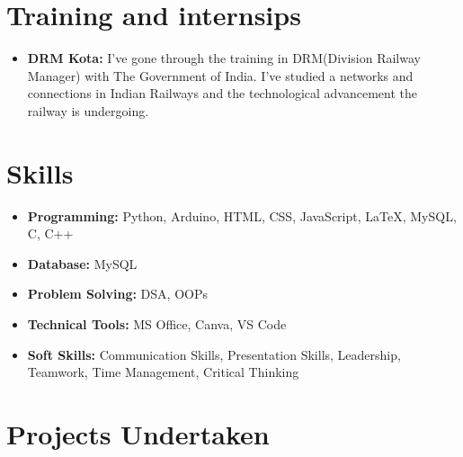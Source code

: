 \documentclass[10pt]{article}
\begin{document}
\section*{{\LARGE \color{myblue}Training and internsips}\xfilll[0pt]{0.5pt}}

\vspace{-15pt}
\vspace{1.5mm}

\begin{itemize}[itemsep = -0.70 mm, leftmargin=*]

\item \noindent \textbf{DRM Kota:} I've gone through the training in DRM(Division Railway Manager) with The Government of India. I've studied a networks and connections in Indian Railways and the technological advancement the railway is undergoing.
\end{itemize}

\vspace{-15pt}
\vspace{-5 pt}
\section*{{\LARGE \color{myblue}Skills}\xfilll[0pt]{0.5pt}}

\vspace{-15pt}
\vspace{1.5mm}

\begin{itemize}[itemsep = -0.70 mm, leftmargin=*]

\item \noindent \textbf{Programming:}  Python, Arduino, HTML, CSS, JavaScript, LaTeX, MySQL, C, C++
\item \noindent \textbf{Database:}  MySQL
\item \noindent \textbf{Problem Solving:}  DSA, OOPs
\item \noindent \textbf{Technical Tools:}  MS Office, Canva, VS Code
\item \noindent \textbf{Soft Skills:}  Communication Skills, Presentation Skills, Leadership, Teamwork, Time Management, Critical Thinking
\end{itemize}	

\vspace{-20pt}
\section*{{ \LARGE \color{myblue} Projects Undertaken}\xfilll[0pt]{0.5pt}}
\vspace{-15pt}
\vspace{1.5mm}
\end{document}
